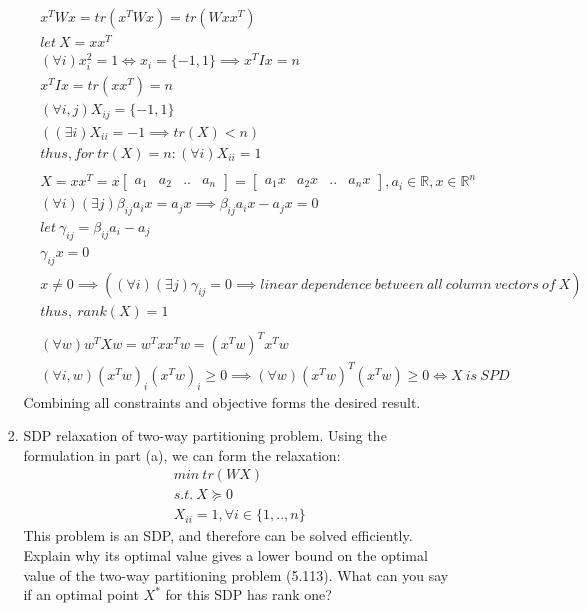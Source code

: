 \documentclass[12pt,letter]{article}
\newcommand{\R}{\mathbb{R}}
\begin{document}
\begin{enumerate}
\begin{enumerate}
\begin{enumerate}
    \begin{align*}
      &x^T W x = tr(x^T W x)=tr(Wxx^T)\\
      &let\ X=xx^T\\
      &(\forall i) x_i^2 = 1 \iff x_i = \{-1,1\} \implies x^TIx = n\\
      &x^TIx = tr(xx^T)=n\\
      &(\forall i,j) X_{ij} = \{-1,1\}\\
      &((\exists i)X_{ii}=-1 \implies tr(X) < n)\\
      &thus, for\ tr(X)=n: (\forall i)X_{ii}=1\\
      \\
      &X=xx^T=x
      \begin{bmatrix}
        a_1 & a_2 & .. & a_n
      \end{bmatrix} =
                         \begin{bmatrix}
                           a_1 x & a_2 x & .. & a_n x
                         \end{bmatrix}, a_i \in \R, x \in \R^n\\
      &(\forall i)(\exists j) \beta_{ij} a_i x = a_j x \implies \beta_{ij} a_i x - a_j x = 0\\
      &let\ \gamma_{ij} = \beta_{ij} a_i - a_j\\
      &\gamma_{ij} x = 0\\
      &x\not=0 \implies ((\forall i)(\exists j) \gamma_{ij} = 0 \implies linear\ dependence\ between\ all\ column\ vectors\ of\ X)\\
      &thus,\ rank(X)=1\\
      \\
      &(\forall w) w^TXw = w^Txx^Tw = (x^Tw)^T x^Tw\\
      &(\forall i, w)(x^Tw)_i (x^Tw)_i \geq 0 \implies (\forall w)(x^Tw)^T (x^Tw) \geq 0 \iff X\ is\ SPD
    \end{align*}
    Combining all constraints and objective forms the desired result.
    \pagebreak
  \item
    SDP relaxation of two-way partitioning problem. Using the formulation in part (a), we can form the relaxation:
    \begin{align*}
      min\ tr(W X)\\
      s.t.\ X \succeq 0\\
      X_{ii} = 1, \forall i \in \{1,..,n\}
    \end{align*}
    This problem is an SDP, and therefore can be solved efficiently. Explain why its optimal value gives a lower bound on the optimal value of the two-way partitioning problem (5.113). What can you say if an optimal point $X^*$ for this SDP has rank one?

\end{enumerate}
\end{enumerate}
\end{enumerate}
\end{document}
